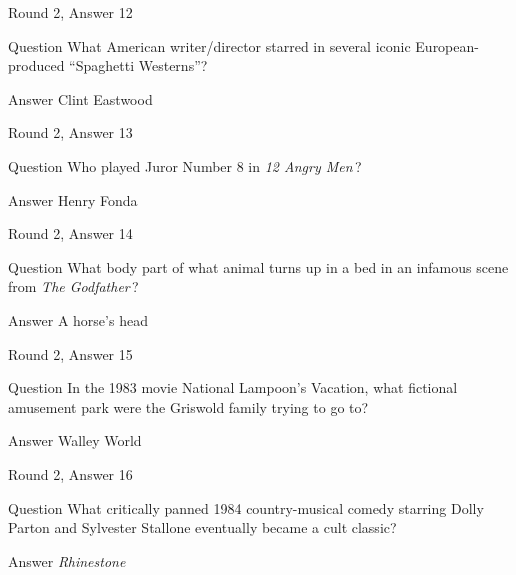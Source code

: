 \documentclass[11pt]{beamer}
\begin{document}
\begin{frame}[t]{Round 2, Answer 12}
\vspace{2em}
\begin{block}{Question}
What American writer/director starred in several iconic European-produced ``Spaghetti Westerns''?
\end{block}
\pause{}
\begin{block}{Answer}
Clint Eastwood
\end{block}
\end{frame}
    

\begin{frame}[t]{Round 2, Answer 13}
\vspace{2em}
\begin{block}{Question}
Who played Juror Number 8 in \emph{12 Angry Men}\,?
\end{block}
\pause{}
\begin{block}{Answer}
Henry Fonda
\end{block}
\end{frame}
    

\begin{frame}[t]{Round 2, Answer 14}
\vspace{2em}
\begin{block}{Question}
What body part of what animal turns up in a bed in an infamous scene from \emph{The Godfather}\,?
\end{block}
\pause{}
\begin{block}{Answer}
A horse's head
\end{block}
\end{frame}
    

\begin{frame}[t]{Round 2, Answer 15}
\vspace{2em}
\begin{block}{Question}
In the 1983 movie National Lampoon's Vacation, what fictional amusement park were the Griswold family trying to go to?
\end{block}
\pause{}
\begin{block}{Answer}
Walley World
\end{block}
\end{frame}
    

\begin{frame}[t]{Round 2, Answer 16}
\vspace{2em}
\begin{block}{Question}
What critically panned 1984 country-musical comedy starring Dolly Parton and Sylvester Stallone eventually became a cult classic?
\end{block}
\pause{}
\begin{block}{Answer}
\emph{Rhinestone}
\end{block}
\end{frame}
    
\end{document}
